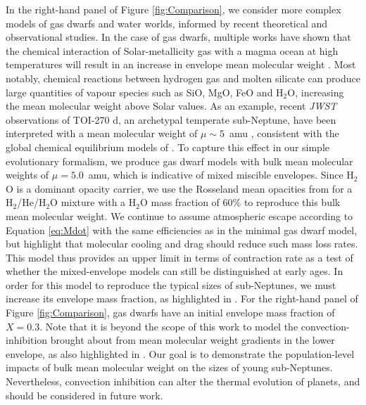 \documentclass[fleqn,usenatbib]{mnras}
\begin{document}
In the right-hand panel of Figure \ref{fig:Comparison}, we consider more complex models of gas dwarfs and water worlds, informed by recent theoretical and observational studies. In the case of gas dwarfs, multiple works have shown that the chemical interaction of Solar-metallicity gas with a magma ocean at high temperatures will result in an increase in envelope mean molecular weight \citep{Kite2021,Schlichting2022,Misener2022,Misener2023,Rogers2024b,Young2024}. Most notably, chemical reactions between hydrogen gas and molten silicate can produce large quantities of vapour species such as SiO, MgO, FeO and H$_2$O, increasing the mean molecular weight above Solar values. As an example, recent \textit{JWST} observations of TOI-270 d, an archetypal temperate sub-Neptune, have been interpreted with a mean molecular weight of $\mu \sim 5$~amu \citep{Benneke2024}, consistent with the global chemical equilibrium models of \citet{Schlichting2022,Rogers2024b}. To capture this effect in our simple evolutionary formalism, we produce gas dwarf models with bulk mean molecular weights of $\mu=5.0$~amu, which is indicative of mixed miscible envelopes. Since H$_2$O is a dominant opacity carrier, we use the Rosseland mean opacities from \citet{Kempton2023} for a H$_2$/He/H$_2$O mixture with a H$_2$O mass fraction of $60\%$ to reproduce this bulk mean molecular weight. We continue to assume atmospheric escape according to Equation \ref{eq:Mdot} with the same efficiencies as in the minimal gas dwarf model, but highlight that molecular cooling and drag should reduce such mass loss rates. This model thus provides an upper limit in terms of contraction rate as a test of whether the mixed-envelope models can still be distinguished at early ages. In order for this model to reproduce the typical sizes of sub-Neptunes, we must increase its envelope mass fraction, as highlighted in \citet{Thorngren2019,Misener2022}. For the right-hand panel of Figure \ref{fig:Comparison}, gas dwarfs have an initial envelope mass fraction of $X=0.3$. Note that it is beyond the scope of this work to model the convection-inhibition brought about from mean molecular weight gradients in the lower envelope, as also highlighted in \citet{Misener2022,Misener2023}. Our goal is to demonstrate the population-level impacts of bulk mean molecular weight on the sizes of young sub-Neptunes. Nevertheless, convection inhibition can alter the thermal evolution of planets, and should be considered in future work. 
\end{document}
